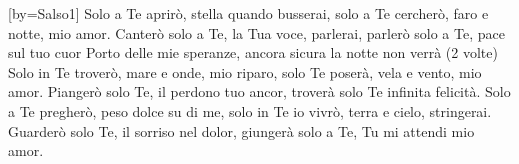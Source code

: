 [by={Salso1}]
\beginverse
Solo a Te aprirò, stella quando busserai,
solo a Te cercherò, faro e notte, mio amor.
Canterò solo a Te, la Tua voce, parlerai,
parlerò solo a Te, pace sul tuo cuor
\endverse
\beginchorus
Porto delle mie speranze,
ancora sicura la notte non verrà (2 volte)
\endchorus
\beginverse
Solo in Te troverò, mare e onde, mio riparo,
solo Te poserà, vela e vento, mio amor.
Piangerò solo Te, il perdono tuo ancor,
troverà solo Te infinita felicità.
\endverse \beginverse
Solo a Te pregherò, peso dolce su di me,
solo in Te io vivrò, terra e cielo, stringerai.
Guarderò solo Te, il sorriso nel dolor,
giungerà solo a Te, Tu mi attendi mio amor.
\endverse
\endsong
